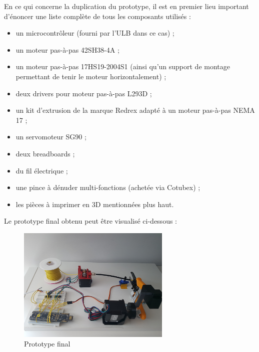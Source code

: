 \par En ce qui concerne la duplication du prototype, il est en premier lieu important d'énoncer une liste complète de tous les composants utilisés :
\begin{itemize}
    \item un microcontrôleur (fourni par l'ULB dans ce cas) ;
    \item un moteur pas-à-pas 42SH38-4A ;
    \item un moteur pas-à-pas 17HS19-2004S1 (ainsi qu'un support de montage permettant de tenir le moteur horizontalement) ;
    \item deux drivers pour moteur pas-à-pas L293D ;
    \item un kit d'extrusion de la marque Redrex adapté à un moteur pas-à-pas NEMA 17 ;
    \item un servomoteur SG90 ;
    \item deux breadboards ;
    \item du fil électrique ;
    \item une pince à dénuder multi-fonctions (achetée via Cotubex) ;
    \item les pièces à imprimer en 3D mentionnées plus haut.
\end{itemize}

Le prototype final obtenu peut être visualisé ci-dessous :

\begin{figure}[H]
    \centering
    \includegraphics[width=0.65\textwidth]{images/proto1.jpg}
    \caption{Prototype final}
    \label{fig:proto1}
\end{figure}

